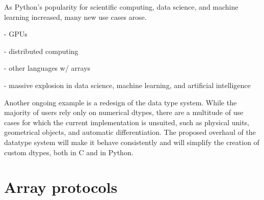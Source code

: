 As Python's popularity for scientific computing, data science, and machine
learning increased, many new use cases arose.

- GPUs

- distributed computing

- other languages w/ arrays

- massive explosion in data science, machine learning, and artificial intelligence


Another ongoing example is a redesign of the data type system.
While the majority of users rely only on numerical dtypes, there are a
multitude of use cases for which the current implementation is unsuited, such
as physical units\cite{astropy,Goldbaum2018,pint}, geometrical
objects\cite{pygeos}, and automatic differentiation\cite{pyadolc}.
The proposed overhaul of the datatype system will make it behave consistently
and will simplify the creation of custom dtypes, both in C and in Python.

\section*{Array protocols}




